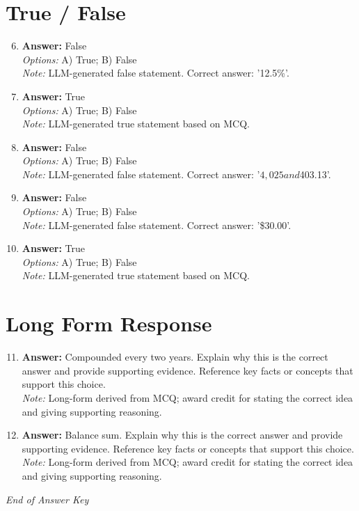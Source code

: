 \documentclass[12pt]{article}
\begin{document}
\section*{True / False}
\begin{enumerate}[label=\arabic*.]
\setcounter{enumi}{5}
\item \textbf{Answer:} False
\\ \textit{Options:} A) True; B) False
\\ \textit{Note:} LLM-generated false statement. Correct answer: '12.5\%'.
\item \textbf{Answer:} True
\\ \textit{Options:} A) True; B) False
\\ \textit{Note:} LLM-generated true statement based on MCQ.
\item \textbf{Answer:} False
\\ \textit{Options:} A) True; B) False
\\ \textit{Note:} LLM-generated false statement. Correct answer: '$4,025 and $403.13'.
\item \textbf{Answer:} False
\\ \textit{Options:} A) True; B) False
\\ \textit{Note:} LLM-generated false statement. Correct answer: '\$30.00'.
\item \textbf{Answer:} True
\\ \textit{Options:} A) True; B) False
\\ \textit{Note:} LLM-generated true statement based on MCQ.
\end{enumerate}

\section*{Long Form Response}
\begin{enumerate}[label=\arabic*.]
\setcounter{enumi}{10}
\item \textbf{Answer:} Compounded every two years. Explain why this is the correct answer and provide supporting evidence. Reference key facts or concepts that support this choice.
\\ \textit{Note:} Long-form derived from MCQ; award credit for stating the correct idea and giving supporting reasoning.
\item \textbf{Answer:} Balance sum. Explain why this is the correct answer and provide supporting evidence. Reference key facts or concepts that support this choice.
\\ \textit{Note:} Long-form derived from MCQ; award credit for stating the correct idea and giving supporting reasoning.
\end{enumerate}

\vfill
\noindent\textit{End of Answer Key}
\end{document}
